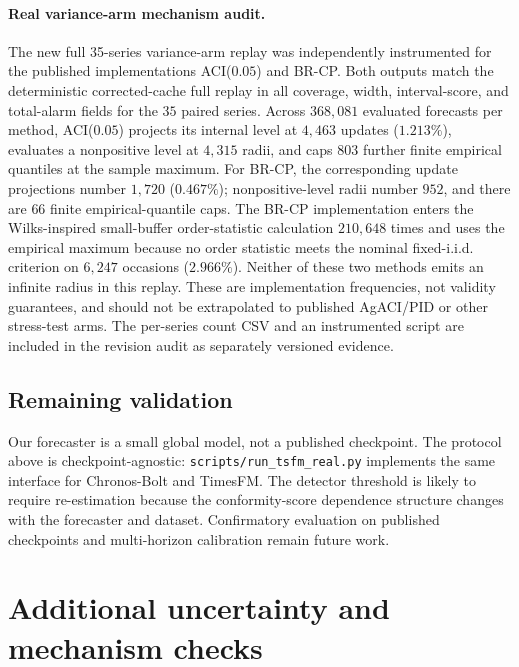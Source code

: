 \documentclass[10pt]{article}
\begin{document}
\paragraph{Real variance-arm mechanism audit.}
The new full 35-series variance-arm replay was independently instrumented
for the published implementations ACI($0.05$) and BR-CP. Both outputs
match the deterministic corrected-cache full replay in all coverage, width,
interval-score, and total-alarm fields for the $35$ paired series. Across
$368{,}081$ evaluated forecasts per method, ACI($0.05$) projects its
internal level at $4{,}463$ updates ($1.213\%$), evaluates a nonpositive
level at $4{,}315$ radii, and caps $803$ further finite empirical quantiles
at the sample maximum. For BR-CP, the corresponding update projections
number $1{,}720$ ($0.467\%$); nonpositive-level radii number $952$, and
there are $66$ finite empirical-quantile caps. The BR-CP implementation
enters the Wilks-inspired small-buffer order-statistic calculation
$210{,}648$ times and uses the empirical maximum because no order statistic
meets the nominal fixed-i.i.d. criterion on $6{,}247$ occasions ($2.966\%$).
Neither of these two methods emits an infinite radius in this replay.
These are implementation frequencies, not validity guarantees, and should
not be extrapolated to published AgACI/PID or other stress-test arms.
The per-series count CSV and an instrumented script are included in the
revision audit as separately versioned evidence.

\subsection{Remaining validation}

Our forecaster is a small global model, not a published checkpoint. The
protocol above is checkpoint-agnostic: \texttt{scripts/run\_tsfm\_real.py}
implements the same interface for Chronos-Bolt and TimesFM.
The detector threshold is likely to require re-estimation because the conformity-score dependence structure changes with the forecaster and dataset. Confirmatory evaluation on published checkpoints and multi-horizon calibration remain future work.

\section{Additional uncertainty and mechanism checks}
\label{sec:extra}
\end{document}
